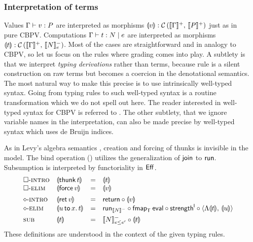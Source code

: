 \documentclass[acmsmall,review,anonymous]{acmart}\settopmatter{printfolios=true,printccs=false,printacmref=false}
\newcommand{\graybox}[1]{\grayboxtext{$#1$}}
\theoremstyle{remark}
\begin{document}

\subsubsection{Interpretation of terms}

Values $\ValTy \Gamma v P$ are interpreted as morphisms $\dent v :
\Hom {\denp \Gamma} {\denp P}$ just as in pure CBPV.  Computations
$\CompTy \Gamma t e N$ are interpreted as morphisms $\dent t : \Hom
{\denp \Gamma} {\Denn N e}$.  Most of the cases are straightforward
and in analogy to CBPV, so let us focus on the
\graybox{\mbox{modified}} rules where grading comes into play.  A
subtlety is that we interpret \emph{typing derivations} rather than terms,
because rule \rsub is a silent construction on raw terms but becomes a
coercion in the denotational semantics.  The most natural way to make
this precise is to use intrinsically well-typed syntax.  Going from typing
rules to such well-typed syntax is a routine transformation which we
do not spell out here.  The reader interested in well-typed syntax for
CBPV is referred to \citet{abelSattler:ppdp19}.
The other subtlety, that we ignore variable names in the
interpretation, can also be made precise by well-typed syntax which
uses de Bruijn indices.

As in Levy's algebra semantics \citeyearpar{levy:hosc06}, creation and
forcing of thunks is invisible in the model.  The bind operation
(\relim\diamond) utilizes the generalization of $\tjoin$ to $\trun$.
Subsumption is interpreted by functoriality in $\Eff$.
\[
\begin{array}{llcl}
\rintro\Box & \dent{\thunk t} & = & \dent t \\
\relim\Box  & \dent{\force v} & = & \dent v
\\[1ex]
\rintro\diamond & \dent{\ret v} & = & \treturn \comp \dent v \\
\relim\diamond  & \dent{\bind x u t} & = &
  \run[\denn N] \comp \fmap[\T]\teval \comp \strengthl \comp
  \langle \Lambda\dent t,\,\dent u \rangle
\\[1ex]
\rsub & \dent t & = & \Denn N {e \leq e'} \comp \dent t
\\
\end{array}
\]
These definitions are understood in the context of the given typing rules.
\end{document}
